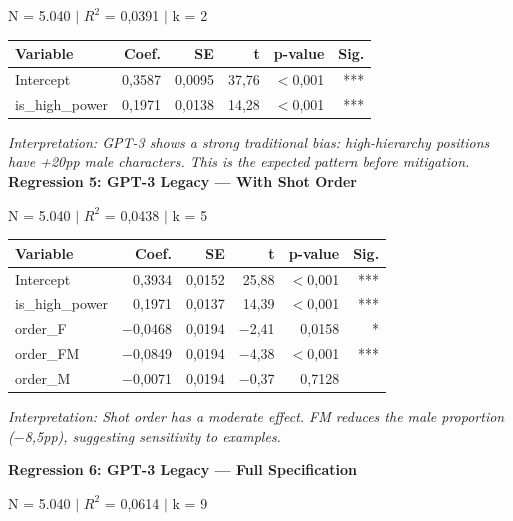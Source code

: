\documentclass[12pt,a4paper]{article}
\begin{document}
\noindent N = 5.040 $|$ $R^2$ = 0,0391 $|$ k = 2

\begin{table}[H]
\centering
\begin{tabular}{lrrrrr}
\toprule
\textbf{Variable} & \textbf{Coef.} & \textbf{SE} & \textbf{t} & \textbf{p-value} & \textbf{Sig.} \\
\midrule
Intercept & 0,3587 & 0,0095 & 37,76 & $<$0,001 & *** \\
is\_high\_power & 0,1971 & 0,0138 & 14,28 & $<$0,001 & *** \\
\bottomrule
\end{tabular}
\end{table}

\noindent\textit{Interpretation: GPT-3 shows a strong traditional bias: high-hierarchy
positions have +20pp male characters. This is the expected pattern
before mitigation.}
\vspace{0.5cm}
\noindent\textbf{Regression 5: GPT-3 Legacy --- With Shot Order}

\noindent N = 5.040 $|$ $R^2$ = 0,0438 $|$ k = 5

\begin{table}[H]
\centering
\begin{tabular}{lrrrrr}
\toprule
\textbf{Variable} & \textbf{Coef.} & \textbf{SE} & \textbf{t} & \textbf{p-value} & \textbf{Sig.} \\
\midrule
Intercept & 0,3934 & 0,0152 & 25,88 & $<$0,001 & *** \\
is\_high\_power & 0,1971 & 0,0137 & 14,39 & $<$0,001 & *** \\
order\_F & $-$0,0468 & 0,0194 & $-$2,41 & 0,0158 & * \\
order\_FM & $-$0,0849 & 0,0194 & $-$4,38 & $<$0,001 & *** \\
order\_M & $-$0,0071 & 0,0194 & $-$0,37 & 0,7128 & \\
\bottomrule
\end{tabular}
\end{table}

\noindent\textit{Interpretation: Shot order has a moderate effect. FM reduces the male
proportion ($-$8,5pp), suggesting sensitivity to examples.}

\vspace{0.5cm}
\noindent\textbf{Regression 6: GPT-3 Legacy --- Full Specification}

\noindent N = 5.040 $|$ $R^2$ = 0,0614 $|$ k = 9
\end{document}
